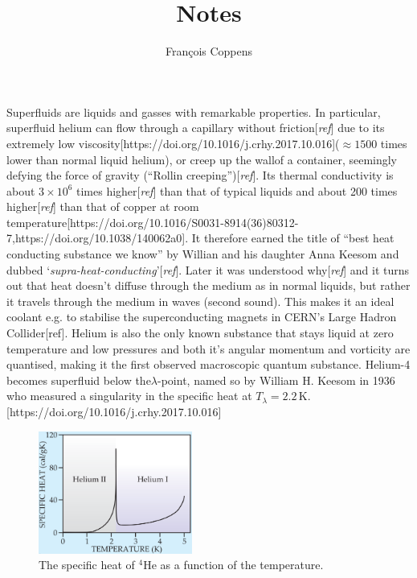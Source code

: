 \documentclass[11pt,a4paper,twoside]{article}
\author{François Coppens}
\title{Notes}
\newcommand{\unit}[1]{\,\mathrm{#1}}
\begin{document}
	Superfluids are liquids and gasses with remarkable properties. In particular, superfluid helium can flow through a capillary without friction[\emph{ref}] due to its extremely low viscosity[https://doi.org/10.1016/j.crhy.2017.10.016]($\approx\!1500$ times lower than normal liquid helium), or creep up the wallof a container, seemingly defying the force of gravity (``Rollin creeping'')[\emph{ref}]. Its thermal conductivity is about $3\times10^6$ times higher[\emph{ref}] than that of typical liquids and about 200 times higher[\emph{ref}] than that of copper at room temperature[https://doi.org/10.1016/S0031-8914(36)80312-7,https://doi.org/10.1038/140062a0]. It therefore earned the title of ``best heat conducting substance we know'' by Willian and his daughter Anna Keesom and dubbed `\emph{supra-heat-conducting}'[\emph{ref}]. Later it was understood why[\emph{ref}] and it turns out that heat doesn't diffuse through the medium as in normal liquids, but rather it travels through the medium in waves (second sound). This makes it an ideal coolant e.g. to stabilise the superconducting magnets in CERN's Large Hadron Collider[ref]. Helium is also the only known substance that stays liquid at zero temperature and low pressures and both it's angular momentum and vorticity are quantised, making it the first observed macroscopic quantum substance. Helium-4 becomes superfluid below the$\lambda$-point, named so by William H. Keesom in 1936 who measured a singularity in the specific heat at $T_\lambda=2.2\unit{K}$.[https://doi.org/10.1016/j.crhy.2017.10.016]\\
	
	\begin{figure}
		\begin{center}
			\includegraphics[width=0.45\textwidth]{specific-heat}
		\end{center}
		\caption{The specific heat of $^4$He as a function of the temperature.}
		\label{fig:specific-heat}
	\end{figure}	
	
\end{document}
